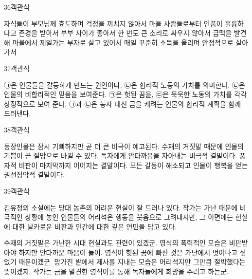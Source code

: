 \documentclass[fs9,seriesRus]{korfarm-base}
\begin{document}
\begin{kfQBlock}{36}{객관식}
\begin{kfChoices}
\kfChoice 자식들이 부모님께 효도하며 걱정을 끼치지 않아서
\kfChoice 마을 사람들로부터 인품이 훌륭하다고 존경을 받아서
\kfChoice 부부 사이가 좋아서 한 번도 큰 소리로 싸우지 않아서
\kfChoice 금맥을 발견해 마을에서 제일가는 부자로 살고 있어서
\kfChoice 매일 꾸준히 소득을 올리며 안정적으로 살아가서
\end{kfChoices}
\end{kfQBlock}
\begin{kfQBlock}{37}{객관식}
\begin{kfChoices}
\kfChoice ㉠은 인물들을 갈등하게 만드는 원인이다.
\kfChoice ㉢은 합리적 노동의 가치를 의미한다.
\kfChoice ㉡은 인물의 비합리적인 믿음을 보여준다.
\kfChoice ㉠은 헛된 꿈을, ㉢은 묵묵한 노동의 가치를 각각 상징적으로 보여 준다.
\kfChoice ㉠과 ㉡은 농사 대신 금을 캐려는 인물의 합리적 계획을 함께 드러낸다.
\end{kfChoices}
\end{kfQBlock}
\begin{kfQBlock}{38}{객관식}
\begin{kfChoices}
\kfChoice 등장인물은 잠시 기뻐하지만 곧 더 큰 비극이 예고된다.
\kfChoice 수재의 거짓말 때문에 인물의 기쁨이 곧 절망으로 바뀔 수 있다.
\kfChoice 독자에게 안타까움을 자아내는 비극적 결말이다.
\kfChoice 풍자적 비판이 마지막까지 이어지는 결말이다.
\kfChoice 모든 갈등이 해소되고 인물이 행복을 얻는 권선징악적 결말이다.
\end{kfChoices}
\end{kfQBlock}
\begin{kfQBlock}{39}{객관식}
\begin{kfEvidence}김유정의 소설에는 당대 농촌의 어려운 현실이 잘 드러나 있다. 작가는 가난 때문에 비극적인 상황에 놓인 인물들의 어리석은 행동을 웃음으로 그려내지만, 그 이면에는 현실에 대한 날카로운 비판과 인간에 대한 깊은 연민을 담고 있다.\end{kfEvidence}
\begin{kfChoices}
\kfChoice 수재의 거짓말은 가난한 시대 현실과도 관련이 있겠군.
\kfChoice 영식의 폭력적인 모습은 비판받아야 하지만 안타까운 마음이 들어.
\kfChoice 영식이 헛된 꿈에 빠진 것은 가난에서 벗어나고 싶었기 때문이겠군.
\kfChoice 망가진 밭에서 제사를 지내는 모습은 어리석지만 그만큼 절박했다는 뜻이겠지.
\kfChoice 작가는 금을 발견한 영식이를 통해 독자들에게 희망을 주려고 하는군.
\end{kfChoices}
\end{kfQBlock}
\end{document}
